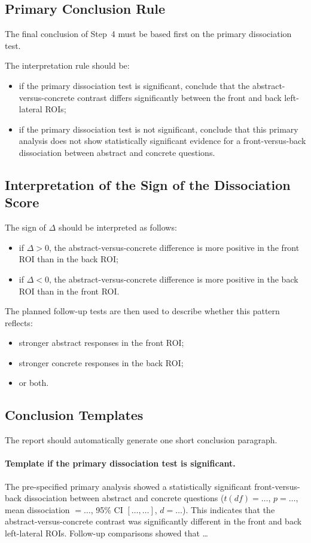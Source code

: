 \subsection{Primary Conclusion Rule}
The final conclusion of Step~4 must be based first on the primary dissociation test.

The interpretation rule should be:
\begin{itemize}
    \item if the primary dissociation test is significant, conclude that the abstract-versus-concrete
    contrast differs significantly between the front and back left-lateral ROIs;
    \item if the primary dissociation test is not significant, conclude that this primary analysis does
    not show statistically significant evidence for a front-versus-back dissociation between abstract
    and concrete questions.
\end{itemize}

\subsection{Interpretation of the Sign of the Dissociation Score}
The sign of \(\Delta\) should be interpreted as follows:
\begin{itemize}
    \item if \(\Delta > 0\), the abstract-versus-concrete difference is more positive in the front ROI
    than in the back ROI;
    \item if \(\Delta < 0\), the abstract-versus-concrete difference is more positive in the back ROI
    than in the front ROI.
\end{itemize}

The planned follow-up tests are then used to describe whether this pattern reflects:
\begin{itemize}
    \item stronger abstract responses in the front ROI;
    \item stronger concrete responses in the back ROI;
    \item or both.
\end{itemize}

\subsection{Conclusion Templates}
The report should automatically generate one short conclusion paragraph.

\paragraph{Template if the primary dissociation test is significant.}
The pre-specified primary analysis showed a statistically significant front-versus-back dissociation
between abstract and concrete questions
(\(t(df)=\ldots\), \(p=\ldots\), mean dissociation \(=\ldots\), 95\% CI \([\ldots,\ldots]\), \(d=\ldots\)).
This indicates that the abstract-versus-concrete contrast was significantly different in the front and
back left-lateral ROIs.
Follow-up comparisons showed that \ldots

